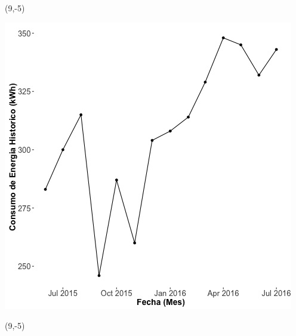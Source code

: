 \documentclass{article}\usepackage[]{graphicx}\usepackage[]{color}
\newenvironment{knitrout}{}{} %
\begin{document}
 \begin{textblock}{1}(9,-5)
\begin{minipage}{20em}
\begingroup

\endgroup
\end{minipage}
\end{textblock}

\begin{knitrout}
\color{fgcolor}
\includegraphics[scale=0.65]{figure/A17_historico_energia} 
\end{knitrout}

 \begin{textblock}{1}(9,-5)
\begin{minipage}{20em}
\begingroup

\endgroup
\end{minipage}
\end{textblock}
\end{document}

